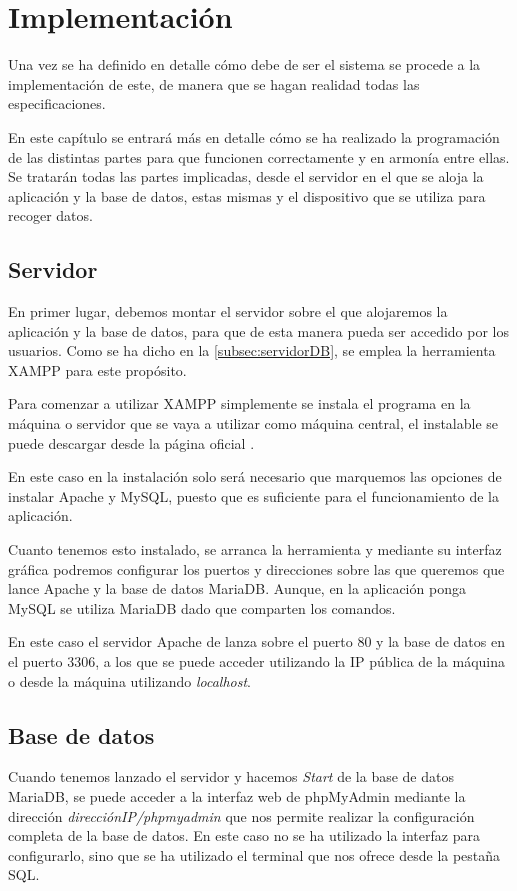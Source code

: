 \chapter{Implementación}
\label{ch:implementacion}
Una vez se ha definido en detalle cómo debe de ser el sistema se procede a la implementación de este, de manera que se hagan realidad todas las especificaciones. 

En este capítulo se entrará más en detalle cómo se ha realizado la programación de las distintas partes para que funcionen correctamente y en armonía entre ellas. Se tratarán todas las partes implicadas, desde el servidor en el que se aloja la aplicación y la base de datos, estas mismas y el dispositivo que se utiliza para recoger datos.

\section{Servidor}
En primer lugar, debemos montar el servidor sobre el que alojaremos la aplicación y la base de datos, para que de esta manera pueda ser accedido por los usuarios. Como se ha dicho en la \autoref{subsec:servidorDB}, se emplea la herramienta XAMPP para este propósito.

Para comenzar a utilizar XAMPP simplemente se instala el programa en la máquina o servidor que se vaya a utilizar como máquina central, el instalable se puede descargar desde la página oficial \cite{noauthor_xampp_nodate}.

En este caso en la instalación solo será necesario que marquemos las opciones de instalar Apache y MySQL, puesto que es suficiente para el funcionamiento de la aplicación.

Cuanto tenemos esto instalado, se arranca la herramienta y mediante su interfaz gráfica podremos configurar los puertos y direcciones sobre las que queremos que lance Apache y la base de datos MariaDB. Aunque, en la aplicación ponga MySQL se utiliza MariaDB dado que comparten los comandos.

En este caso el servidor Apache de lanza sobre el puerto 80 y la base de datos en el puerto 3306, a los que se puede acceder utilizando la IP pública de la máquina o desde la máquina utilizando \textit{localhost}.

\section{Base de datos}
Cuando tenemos lanzado el servidor y hacemos \textit{Start} de la base de datos MariaDB, se puede acceder a la interfaz web de phpMyAdmin mediante la dirección \textit{direcciónIP/phpmyadmin} que nos permite realizar la configuración completa de la base de datos. En este caso no se ha utilizado la interfaz para configurarlo, sino que se ha utilizado el terminal que nos ofrece desde la pestaña SQL. 
\pagebreak

